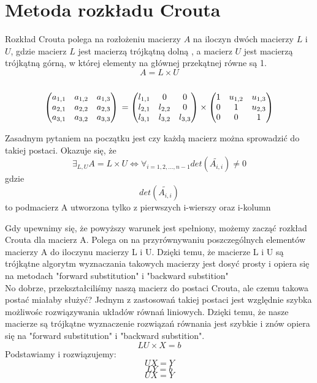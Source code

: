 \documentclass{article}\usepackage{amsmath,amsfonts,amssymb}
\begin{document}
\section{Metoda rozkładu Crouta}
Rozkład Crouta polega na rozłożeniu macierzy $A$ na iloczyn dwóch macierzy $L$ i $U$, gdzie macierz $L$ jest macierzą trójkątną dolną
, a macierz $U$ jest macierzą trójkątną górną, w której elementy na głównej przekątnej równe są 1. \\ 
\[ A = L \times U \]
\\
\begin{equation}
\begin{pmatrix}
  a_{1,1} & a_{1,2} &  a_{1,3} \\
  a_{2,1} & a_{2,2} &  a_{2,3} \\
  a_{3,1} & a_{3,2} & a_{3,3} 
 \end{pmatrix} \\ 
  =  \begin{pmatrix}
  l_{1,1} & 0 &  0 \\
  l_{2,1} & l_{2,2} &  0 \\
  l_{3,1} & l_{3,2} & l_{3,3} 
 \end{pmatrix} \times
 \begin{pmatrix}
  1 & u_{1,2} &  u_{1,3} \\
  0 & 1 &  u_{2,3} \\
  0 & 0 & 1 
\end{pmatrix}
\end{equation}


Zasadnym pytaniem na początku jest czy każdą macierz można sprowadzić do takiej postaci. Okazuje się, że 
\[ \exists_{L,U}{A = L \times U} \Leftrightarrow \forall_{i = 1,2,...,n-1} det(\widetilde{{A}_{i,i}}) \neq 0 \]
gdzie  \[det(\widetilde{{A}_{i,i}})\] to podmacierz A utworzona tylko z pierwszych i-wierszy oraz i-kolumn


Gdy upewnimy się, że powyższy warunek jest spełniony, możemy zacząć rozkład Crouta dla macierz A. Polega on na przyrównywaniu poszczególnych elementów macierzy A do iloczynu macierzy L i U. Dzięki temu, że macierze L i U są trójkątne algorytm wyznaczania takowych macierzy jest dosyć prosty i opiera się na metodach "forward substitution" i "backward substition"  \\

No dobrze, przekształciliśmy naszą macierz do postaci Crouta, ale czemu takowa postać miałaby służyć? Jednym z zastosowań takiej postaci jest względnie szybka możliwośc rozwiązywania układów równań liniowych. Dzięki temu, że nasze macierze są trójkątne wyznaczenie rozwiązań równania jest szybkie i znów opiera się na "forward substitution" i "backward substition".
\[ LU \times X = b \]
Podstawiamy i rozwiązujemy:
\[ UX = Y  \]
\[ LY = b  \]
\[ UX = Y  \]
\end{document}
